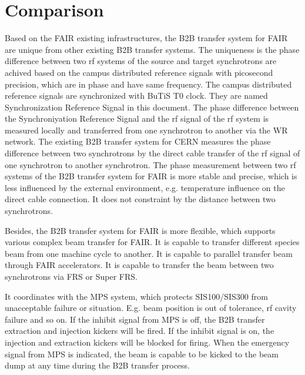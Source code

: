 \section{Comparison}

Based on the FAIR existing infrastructures, the B2B transfer system for FAIR are unique from other existing B2B transfer systems. The uniqueness is the phase difference between two rf systems of the source and target synchrotrons are achived based on the campus distributed reference signals with picosecond precision, which are in phase and have same frequency. The campus distributed reference signals are synchronized with BuTiS T0 clock. They are named Synchronization Reference Signal in this document. The phase difference between the Synchroniyation Reference Signal and the rf signal of the rf system is measured locally and transferred from one synchrotron to another via the WR network. The existing B2B transfer system for CERN measures the phase difference between two synchrotrons by the direct cable transfer of the rf signal of one synchrotron to another synchrotron. The phase measurement between two rf systems of the B2B transfer system for FAIR is more stable and precise, which is less influenced by the external environment, e.g. temperature influence on the direct cable connection. It does not constraint by the distance between two synchrotrons.

Besides, the B2B transfer system for FAIR is more flexible, which supports various complex beam transfer for FAIR.  It is capable to transfer different species beam from one machine cycle to another.  It is capable to parallel transfer beam through FAIR accelerators. It is capable to transfer the beam between two synchrotrons via FRS or Super FRS. 

It coordinates with the MPS system, which protects SIS100/SIS300 from unacceptable failure or situation. E.g. beam position is out of tolerance, rf cavity failure and so on. If the inhibit signal from MPS is off, the B2B transfer extraction and injection kickers will be fired. If the inhibit signal is on, the injection and extraction kickers will be blocked for firing.  When the emergency signal from MPS is indicated, the beam is capable to be kicked to the beam dump at any time during the B2B transfer process.


